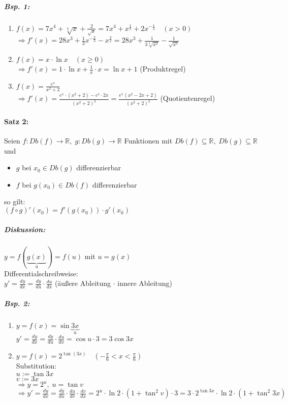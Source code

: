 \subparagraph{Bsp. 1:}
\begin{enumerate}[label=\alph*.)]
\item $f(x)=7x^4+\sqrt[3]{x}+\frac{2}{\sqrt{x}} = 7x^4+x^{\frac{1}{3}}+2x^{-\frac{1}{2}} \quad (x>0)$\\
$\Rightarrow f'(x) = 28 x^3 + \frac{1}{3}x^{-\frac{2}{3}}-x^{\frac{3}{2}}=28x^3+\frac{1}{3\sqrt[3]{x^2}}-\frac{1}{\sqrt{x^3}}$
\item $f(x)=x\cdot \ln x \quad (x\geq 0)$\\
$\Rightarrow f'(x) = 1 \cdot \ln x + \frac{1}{x} \cdot x = \ln x + 1$ (Produktregel)
\item $f(x)=\frac{e^x}{x^2+2}$\\
$\Rightarrow f'(x)=\frac{e^x\cdot (x^2+2)-e^x\cdot 2x}{(x^2+2)^2}=\frac{e^x(x^2-2x+2)}{(x^2+2)^2}$ (Quotientenregel)

\end{enumerate}

\paragraph{Satz 2:} Seien $f: Db(f)\to \mathbb{R}, \; g: Db(g) \to \mathbb{R}$ Funktionen mit $Db(f) \subseteq \mathbb{R}, \; Db(g) \subseteq \mathbb{R}$ und 
\begin{itemize}
\item $g$ bei $x_0 \in Db(g)$ differenzierbar
\item $f$ bei $g(x_0) \in Db (f)$ differenzierbar
\end{itemize}
so gilt:\\
$(f\circ g)'(x_0)=f'(g(x_0))\cdot g'(x_0)$
\subparagraph{Diskussion:} $y=f( \underbrace{g(x)}_{u})=f(u)$ mit $u=g(x)$\\
Differentialschreibweise:\\
$y'=\frac{dy}{dx}=\frac{dy}{du}\cdot \frac{du}{dx}$ \quad (äußere Ableitung $\cdot$ innere Ableitung)

\subparagraph{Bsp. 2:}
\begin{enumerate}[label=\alph*.)]
\item $y=f(x)=\sin \underbrace{3x}_u$\\
$y'=\frac{dy}{dx}=\frac{dy}{du}\cdot \frac{du}{dx}=\cos u \cdot 3=3 \cos 3x$
\item $y=f(x)=2^{\tan(3x)} \quad \left(-\frac{\pi}{6}<x<\frac{\pi}{6}\right)$\\
Substitution: \\
$u:=\tan 3x$\\
$v:=3x$\\
$\Rightarrow y = 2^u, \; u = \tan v$\\
$\Rightarrow y' = \frac{dy}{dx}=\frac{dy}{du} \cdot \frac{du}{dv} \cdot \frac{dv}{dx} = 2^u\cdot \ln 2 \cdot (1+\tan^2 v) \cdot 3= 3\cdot 2^{\tan 3x} \cdot \ln 2 \cdot (1+\tan^2 3x)$
\end{enumerate}

